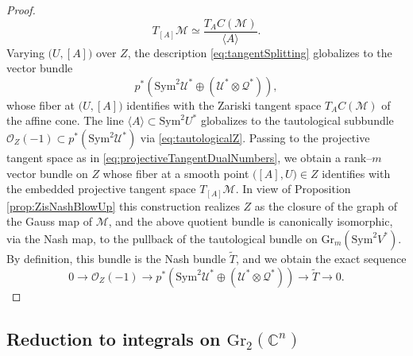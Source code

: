 \documentclass[11pt]{article}
\numberwithin{equation}{section}
\numberwithin{figure}{section}
\theoremstyle{plain}
\theoremstyle{definition}
\theoremstyle{remark}
\newtheorem{rem}[thm]{Remark}
\newcommand{\C}{\mathbb{C}}
\newcommand{\Gr}{\mathrm{Gr}}
\newcommand{\Sym}{\mathrm{Sym}}
\begin{document}
\begin{proof}
\begin{equation}\label{eq:projectiveTangentDualNumbers}
T_{\left[A\right]}\mathcal M \simeq \frac{T_A C\left(\mathcal M\right)}{\langle A\rangle}.
\end{equation}
Varying $\bigl(U,[A]\bigr)$ over $Z$, the description
\eqref{eq:tangentSplitting} globalizes to the vector bundle
\[
p^\ast\!\left(
\Sym^2\mathcal U^\ast \oplus (\mathcal U^\ast \otimes \mathcal Q^\ast)
\right),
\]
whose fiber at $\bigl(U,[A]\bigr)$ identifies with the Zariski tangent space
$T_A C\left(\mathcal M\right)$ of the affine cone.
The line $\langle A\rangle \subset \Sym^2 U^\ast$ globalizes to the
tautological subbundle
$\mathcal O_Z(-1)\subset p^\ast(\Sym^2\mathcal U^\ast)$
via \eqref{eq:tautologicalZ}.
Passing to the projective tangent space as in
\eqref{eq:projectiveTangentDualNumbers}, we obtain a rank--$m$ vector bundle
on $Z$ whose fiber at a smooth point $\bigl([A],U\bigr)\in Z$ identifies with
the embedded projective tangent space $T_{[A]}\mathcal M$.
In view of Proposition \ref{prop:ZisNashBlowUp} this construction realizes $Z$ as the closure of the graph of the Gauss map of $\mathcal M$, and the above quotient bundle is canonically isomorphic, via the Nash map, to the
pullback of the tautological bundle on $\Gr_m\left(\Sym^2 V^\ast\right)$.
By definition, this bundle is the Nash bundle $\widetilde T$, and we obtain the exact sequence
\[
0\longrightarrow \mathcal{O}_Z\left(-1\right)
\longrightarrow
p^\ast\left(
\Sym^2\mathcal U^\ast \oplus \left(\mathcal U^\ast \otimes \mathcal Q^\ast\right)
\right)
\longrightarrow
\widetilde T
\longrightarrow 0.
\]
\end{proof}




\subsection{Reduction to integrals on $\Gr_2 \left(\C^n\right)$}\label{sec:reductionGr}
\end{document}

